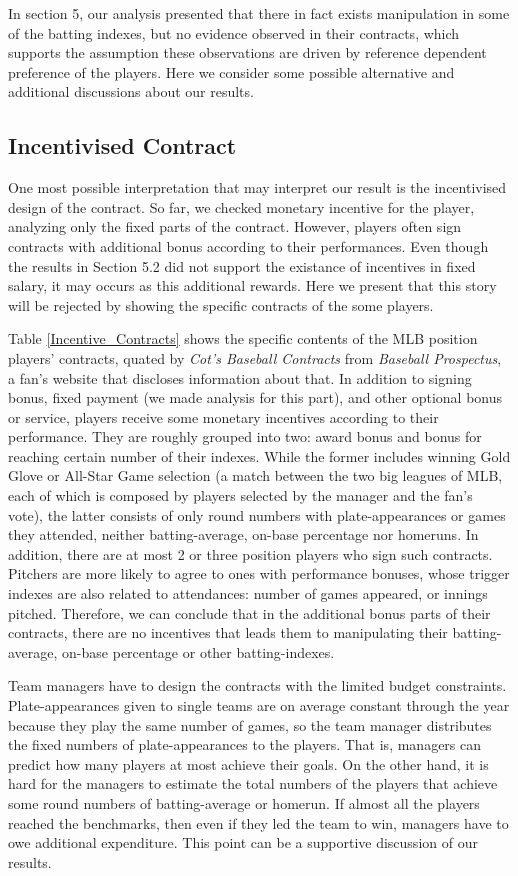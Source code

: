 \documentclass[dvipdfmx, 12pt]{article}
\begin{document}
In section 5, our analysis presented that there in fact exists manipulation in some of the batting indexes, but no evidence observed in their contracts, which supports the assumption these observations are driven by reference dependent preference of the players. Here we consider some possible alternative and additional discussions about our results.

\subsection{Incentivised Contract}

One most possible interpretation that may interpret our result is the incentivised design of the contract. So far, we checked monetary incentive for the player, analyzing only the fixed parts of the contract. However, players often sign contracts with additional bonus according to their performances. Even though the results in Section 5.2 did not support the existance of incentives in fixed salary, it may occurs as this additional rewards. Here we present that this story will be rejected by showing the specific contracts of the some players.

Table \ref{Incentive_Contracts} shows the specific contents of the MLB position players' contracts, quated by \textit{Cot's Baseball Contracts} from \textit{Baseball Prospectus}, a fan's website that discloses information about that. In addition to signing bonus, fixed payment (we made analysis for this part), and other optional bonus or service, players receive some monetary incentives according to their performance. They are roughly grouped into two: award bonus and bonus for reaching certain number of their indexes. While the former includes winning Gold Glove or All-Star Game selection (a match between the two big leagues of MLB, each of which is composed by players selected by the manager and the fan's vote), the latter consists of only round numbers with plate-appearances or games they attended, neither batting-average, on-base percentage nor homeruns. In addition, there are at most 2 or three position players who sign such contracts. Pitchers are more likely to agree to ones with performance bonuses, whose trigger indexes are also related to attendances: number of games appeared, or innings pitched. Therefore, we can conclude that in the additional bonus parts of their contracts, there are no incentives that leads them to manipulating  their batting-average, on-base percentage or other batting-indexes.

Team managers have to design the contracts with the limited budget constraints. Plate-appearances given to single teams are on average constant through the year because they play the same number of games, so the team manager distributes the fixed numbers of plate-appearances to the players. That is, managers can predict how many players at most achieve their goals. On the other hand, it is hard for the managers to estimate the total numbers of the players that achieve some round numbers of batting-average or homerun. If almost all the players reached the benchmarks, then even if they led the team to win, managers have to owe additional expenditure. This point can be a supportive discussion of our results.
\end{document}
